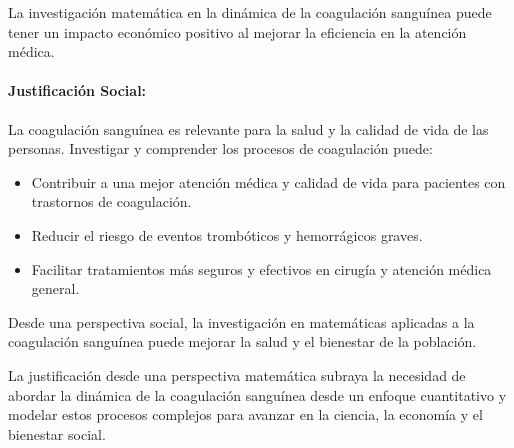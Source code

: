 \documentclass{article}
\begin{document}
La investigación matemática en la dinámica de la coagulación sanguínea puede tener un impacto económico positivo al mejorar la eficiencia en la atención médica.

\paragraph{Justificación Social:}

La coagulación sanguínea es relevante para la salud y la calidad de vida de las personas. Investigar y comprender los procesos de coagulación puede:

\begin{itemize}
    \item Contribuir a una mejor atención médica y calidad de vida para pacientes con trastornos de coagulación.
    \item Reducir el riesgo de eventos trombóticos y hemorrágicos graves.
    \item Facilitar tratamientos más seguros y efectivos en cirugía y atención médica general.
\end{itemize}

Desde una perspectiva social, la investigación en matemáticas aplicadas a la coagulación sanguínea puede mejorar la salud y el bienestar de la población.

La justificación desde una perspectiva matemática subraya la necesidad de abordar la dinámica de la coagulación sanguínea desde un enfoque cuantitativo y modelar estos procesos complejos para avanzar en la ciencia, la economía y el bienestar social.
\end{document}
